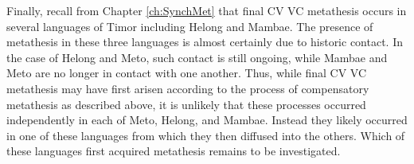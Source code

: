 Finally, recall from Chapter \ref{ch:SynchMet} that final CV {\ra} VC
metathesis occurs in several languages of Timor including Helong and Mambae.
The presence of metathesis in these three languages
is almost certainly due to historic contact.
In the case of Helong and Meto, such contact is still ongoing,
while Mambae and Meto are no longer in contact with one another.
Thus, while final CV {\ra} VC metathesis may have first arisen
according to the process of compensatory metathesis as described above,
it is unlikely that these processes occurred independently
in each of Meto, Helong, and Mambae. Instead they likely occurred
in one of these languages from which they then diffused into the others.
Which of these languages first acquired metathesis remains to be investigated.

